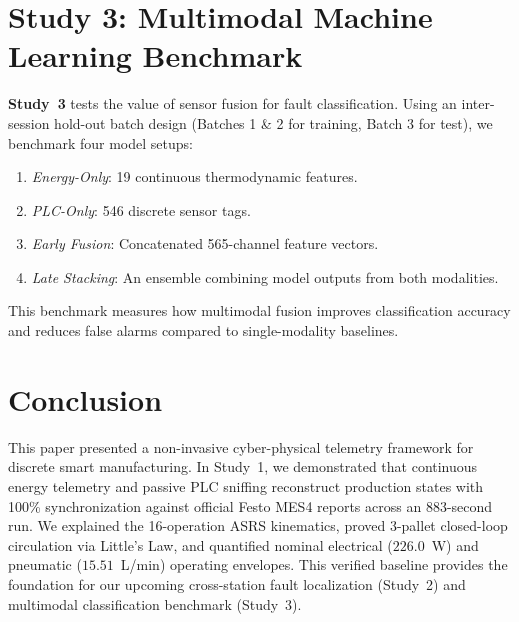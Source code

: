 \documentclass[journal]{IEEEtran}
\begin{document}
\section{Study 3: Multimodal Machine Learning Benchmark}
\label{sec:study3}
\textbf{Study~3} tests the value of sensor fusion for fault classification. Using an inter-session hold-out batch design (Batches 1 \& 2 for training, Batch 3 for test), we benchmark four model setups:
\begin{enumerate}
    \item \textit{Energy-Only}: 19 continuous thermodynamic features.
    \item \textit{PLC-Only}: 546 discrete sensor tags.
    \item \textit{Early Fusion}: Concatenated 565-channel feature vectors.
    \item \textit{Late Stacking}: An ensemble combining model outputs from both modalities.
\end{enumerate}
This benchmark measures how multimodal fusion improves classification accuracy and reduces false alarms compared to single-modality baselines.

\section{Conclusion}
\label{sec:conclusion}
This paper presented a non-invasive cyber-physical telemetry framework for discrete smart manufacturing. In Study~1, we demonstrated that continuous energy telemetry and passive PLC sniffing reconstruct production states with 100\% synchronization against official Festo MES4 reports across an 883-second run. We explained the 16-operation ASRS kinematics, proved 3-pallet closed-loop circulation via Little's Law, and quantified nominal electrical ($226.0$~W) and pneumatic ($15.51$~L/min) operating envelopes. This verified baseline provides the foundation for our upcoming cross-station fault localization (Study~2) and multimodal classification benchmark (Study~3).
\end{document}
